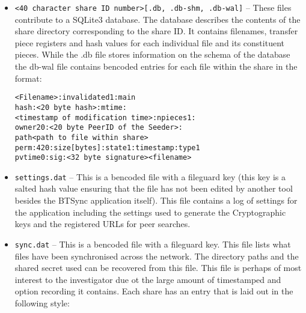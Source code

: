 \documentclass[final,5p,times,twocolumn]{elsarticle}
\begin{document}
\begin{itemize}
\item \texttt{<40 character share ID number>[.db, .db-shm, .db-wal]} -- These files contribute to a SQLite3 database. The database describes the contents of the share directory corresponding to the share ID. It contains filenames, transfer piece registers and hash values for each individual file and its constituent pieces. While the .db file stores information on the schema of the database the db-wal file contains bencoded entries for each file within the share in the format:

\texttt{<Filename>:invalidated1:main} \\
\texttt{hash:<20 byte hash>:mtime:} \\
\texttt{<timestamp of modification time>:npieces1:} \\
\texttt{owner20:<20 byte PeerID of the Seeder>:} \\
\texttt{path<path to file within share>} \\
\texttt{perm:420:size[bytes]:state1:timestamp:type1}  \\
\texttt{pvtime0:sig:<32 byte signature><filename>} \\

\item \texttt{settings.dat} -- This is a bencoded file with a fileguard key (this key is a salted hash value ensuring that the file has not been edited by another tool besides the BTSync application itself). This file contains a log of settings for the application including the settings used to generate the Cryptographic keys and the registered URLs for peer searches.
\item \texttt{sync.dat} -- This is a bencoded file with a fileguard key. This file lists what files have been synchronised across the network. The directory paths and the shared secret used can be recovered from this file. This file is perhaps of most interest to the investigator due ot the large amount of timestamped and option recording it contains. Each share has an entry that is laid out in the following style:


\end{itemize}
\end{document}
